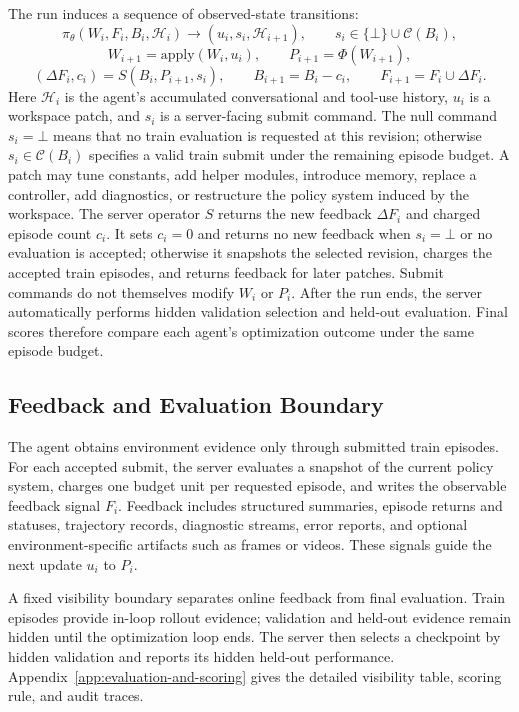 The run induces a sequence of observed-state transitions:
\[
\pi_\theta(W_i, F_i, B_i, \mathcal{H}_i)
\rightarrow (u_i,s_i,\mathcal{H}_{i+1}),\qquad
s_i\in\{\bot\}\cup\mathcal{C}(B_i),
\]
\[
W_{i+1}=\mathrm{apply}(W_i,u_i),\qquad
P_{i+1}=\Phi(W_{i+1}),
\]
\[
(\Delta F_i,c_i)=S(B_i,P_{i+1},s_i),\qquad
B_{i+1}=B_i-c_i,\qquad
F_{i+1}=F_i\cup\Delta F_i.
\]
Here $\mathcal{H}_i$ is the agent's accumulated conversational and tool-use
history, $u_i$ is a workspace patch, and $s_i$ is a server-facing submit
command. The null command $s_i=\bot$ means that no train evaluation is requested
at this revision; otherwise $s_i\in\mathcal{C}(B_i)$ specifies a valid train
submit under the remaining episode budget. A patch may tune constants, add
helper modules, introduce memory, replace a controller, add diagnostics, or
restructure the policy system induced by the workspace. The server operator $S$
returns the new feedback $\Delta F_i$ and charged episode count $c_i$. It sets
$c_i=0$ and returns no new feedback when $s_i=\bot$ or no evaluation is
accepted; otherwise it snapshots the selected revision, charges the accepted
train episodes, and returns feedback for later patches. Submit commands do not
themselves modify $W_i$ or $P_i$. After the run ends, the server
automatically performs hidden validation selection and held-out evaluation.
Final scores therefore compare each agent's optimization outcome under the same episode budget.


\FloatBarrier
\subsection{Feedback and Evaluation Boundary}
\label{sec:feedback-signals}

The agent obtains environment evidence only through submitted train episodes.
For each accepted submit, the server evaluates a snapshot of the current policy
system, charges one budget unit per requested episode, and writes the
observable feedback signal $F_i$. Feedback includes structured summaries,
episode returns and statuses, trajectory records, diagnostic streams, error
reports, and optional environment-specific artifacts such as frames or videos.
These signals guide the next update $u_i$ to $P_i$.

A fixed visibility boundary separates online feedback from final evaluation.
Train episodes provide in-loop rollout evidence; validation and held-out
evidence remain hidden until the optimization loop ends.
The server then
selects a checkpoint by hidden validation and reports its hidden held-out
performance.
Appendix~\ref{app:evaluation-and-scoring} gives the detailed visibility table,
scoring rule, and audit traces.

